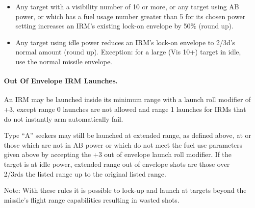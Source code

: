 \begin{advancedrules}
\begin{itemize}

    \item Any target with a visibility number of 10 or more, or any target using AB power, or which has a fuel usage number greater than 5 for its chosen power setting increases an IRM's existing lock-on envelope by 50\% (round up).

    \item Any target using idle power reduces an IRM's lock-on envelope to 2/3d's normal amount (round up). Exception: for a large (Vis 10+) target in idle, use the normal missile envelope.

\end{itemize}

\paragraph{Out Of Envelope IRM Launches.}\label{rule:irm-out-of-envelope-launches} An IRM may be launched inside its minimum range with a launch roll modifier of +3, except range 0 launches are not allowed and range 1 launches for IRMs that do not instantly arm automatically fail.

Type “A” seekers may still be launched at extended range, as defined above, at  or those which are not in AB power or which do not meet the fuel use parameters given above by accepting the +3 out of envelope launch roll modifier. If the target is at idle power, extended range out of envelope shots are those over 2/3rds the listed range up to the original listed range.

Note: With these rules it is possible to lock-up and launch at targets beyond the missile's flight range capabilities resulting in wasted shots.

\end{advancedrules}
